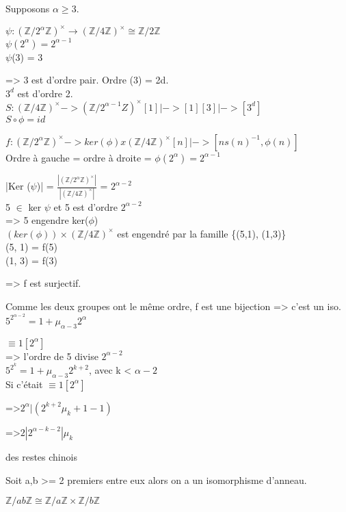 \begin{dem}
	Supposons $\alpha \geq3$.
	
	$\psi : (\mathbb{Z}/2^{\alpha}\mathbb{Z})^{\times} \to (\mathbb{Z}/4\mathbb{Z})^{\times} \cong \mathbb{Z}/2\mathbb{Z}$\\
	$\psi(2^\alpha) = 2^{\alpha-1}$\\
	$\psi$(3) = 3
	
	=> 3 est d'ordre pair. Ordre (3) = 2d.\\\newline
	$3^{d}$ est d'ordre 2.\\
	$S: (\mathbb{Z}/4\mathbb{Z})^{\times} -> (\mathbb{Z}/2^{\alpha -1}Z)^{\times}
				[1] |-> [1]
				[3] |-> [3^{d}]$\\
	$S \circ \phi = id$
	
	$f : (\mathbb{Z}/2^{\alpha}\mathbb{Z})^{\times} -> ker(\phi) x (\mathbb{Z}/4\mathbb{Z})^{\times}
							[n] |-> [n s(n)^{-1}, \phi(n)]$\\
	Ordre à gauche = ordre à droite = $\phi(2^{\alpha}) = 2^{\alpha -1}$
	
	|Ker ($\psi$)| = $\frac{|(\mathbb{Z}/2^{\alpha}\mathbb{Z})^{\times}|}{|(\mathbb{Z}/4\mathbb{Z})^{\times}|}$ = $2^{\alpha-2}$\\
	5 $\in$ ker $\psi$ et 5 est d'ordre $2^{\alpha-2}$\\
	=> 5 engendre ker($\phi$)\\
	$(ker(\phi)) \times (\mathbb{Z}/4\mathbb{Z})^{\times}$ est engendré par la famille \{(5,1), (1,3)\} \\
	(5, 1) = f(5)\\
	(1, 3) = f(3)
	
	=> f est surjectif. 
	
	Comme les deux groupes ont le même ordre, f est une bijection => c'est un iso.\\
	$5^{2^{\alpha-2}} = 1+ \mu_{\alpha-3}2^\alpha$
	
	$\equiv 1[2^\alpha]$\\
	=> l'ordre de 5 divise $2^{\alpha-2}$\\
	$5^{2^k} = 1+ \mu_{\alpha-3}2^{k+2}$, avec k < $\alpha-2$\\
	Si c'était $\equiv 1 [2^\alpha]$
	
	=>$2^{\alpha} | (2^{k+2}\mu_{k} +1 -1)$
	
	=>$2 | 2^{\alpha-k-2} | \mu_{k}$
\end{dem}
\begin{thm} des restes chinois
	
	Soit a,b >= 2 premiers entre eux alors on a un isomorphisme d'anneau.
	
	$\mathbb{Z}/ab\mathbb{Z} \cong \mathbb{Z}/a\mathbb{Z} \times \mathbb{Z}/b\mathbb{Z}$
\end{thm}
